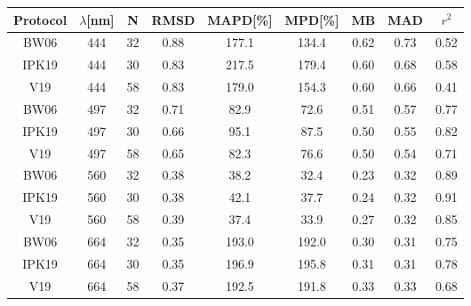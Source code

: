 \documentclass[preview]{standalone}
\begin{document}
\small

\begin{table}
\begin{tabular}{ccccccccc}
\hline
Protocol & $\lambda$[nm] & N & RMSD & MAPD[\%] & MPD[\%] & MB & MAD & $r^2$  \\\hline
BW06 & 444 & 32 & 0.88 & 177.1 & 134.4 & 0.62 & 0.73 & 0.52\\
IPK19 & 444 & 30 & 0.83 & 217.5 & 179.4 & 0.60 & 0.68 & 0.58\\
V19 & 444 & 58 & 0.83 & 179.0 & 154.3 & 0.60 & 0.66 & 0.41\\\hline

BW06 & 497 & 32 & 0.71 & 82.9 & 72.6 & 0.51 & 0.57 & 0.77\\
IPK19 & 497 & 30 & 0.66 & 95.1 & 87.5 & 0.50 & 0.55 & 0.82\\
V19 & 497 & 58 & 0.65 & 82.3 & 76.6 & 0.50 & 0.54 & 0.71\\\hline

BW06 & 560 & 32 & 0.38 & 38.2 & 32.4 & 0.23 & 0.32 & 0.89\\
IPK19 & 560 & 30 & 0.38 & 42.1 & 37.7 & 0.24 & 0.32 & 0.91\\
V19 & 560 & 58 & 0.39 & 37.4 & 33.9 & 0.27 & 0.32 & 0.85\\\hline

BW06 & 664 & 32 & 0.35 & 193.0 & 192.0 & 0.30 & 0.31 & 0.75\\
IPK19 & 664 & 30 & 0.35 & 196.9 & 195.8 & 0.31 & 0.31 & 0.78\\
V19 & 664 & 58 & 0.37 & 192.5 & 191.8 & 0.33 & 0.33 & 0.68\\\hline

\end{tabular}
\end{table}
\end{document}
